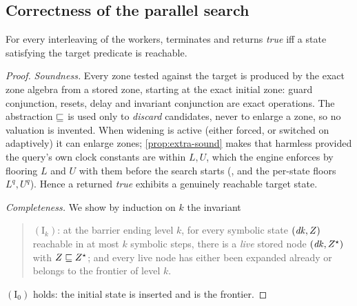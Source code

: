 \subsection{Correctness of the parallel search}

\begin{theorem}\label{thm:correct}
For every interleaving of the workers,  terminates and
returns \emph{true} iff a state satisfying the target predicate is reachable.
\end{theorem}

\begin{proof}
\emph{Soundness.}  Every zone tested against the target is produced by the exact
zone algebra from a stored zone, starting at the exact initial zone: guard
conjunction, resets, delay and invariant conjunction are exact operations.  The
abstraction $\sqsubseteq$ is used only to \emph{discard} candidates, never to enlarge
a zone, so no valuation is invented.  When widening is active (either forced,
or switched on adaptively) it can enlarge zones; \cref{prop:extra-sound} makes
that harmless provided the query's own clock constants are within $L,U$, which
the engine enforces by flooring $L$ and $U$ with them before the search starts
(, and the per-state floors $L^q, U^q$).  Hence a returned
\emph{true} exhibits a genuinely reachable target state.

\emph{Completeness.}  We show by induction on $k$ the invariant

\begin{quote}
$(\mathrm{I}_k)$: at the barrier ending level $k$, for every symbolic state
$(\mathit{dk}, Z)$ reachable in at most $k$ symbolic steps, there is a \emph{live}
stored node $(\mathit{dk}, Z^\star)$ with $Z \sqsubseteq Z^\star$; and every live node has
either been expanded already or belongs to the frontier of level $k$.
\end{quote}

$(\mathrm{I}_0)$ holds: the initial state is inserted and is the frontier.


\end{proof}
